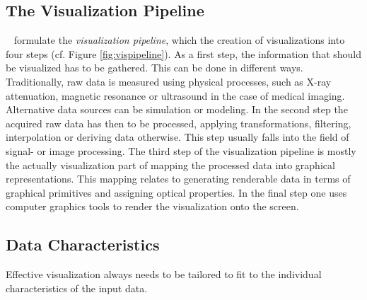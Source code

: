 \subsection{The Visualization Pipeline}
\label{sec:background:vis:vispipeline}

\CN~ formulate the \emph{visualization pipeline}, which  the creation of visualizations into four steps (cf. Figure \ref{fig:vispipeline}).
As a first step, the information that should be visualized has to be gathered.
This can be done in different ways. 
Traditionally, raw data is measured using physical processes, such as X-ray attenuation, magnetic resonance or ultrasound in the case of medical imaging.
Alternative data sources can be simulation or modeling.
In the second step the acquired raw data has then to be processed,  applying transformations, filtering, interpolation or deriving data otherwise.
This step usually falls into the field of signal- or image processing.
The third step of the visualization pipeline is mostly the actually visualization part of mapping the processed data into graphical representations.
This mapping relates to generating renderable data in terms of graphical primitives and assigning optical properties.
In the final step one uses computer graphics tools to render the visualization onto the screen.



\subsection{Data Characteristics}
\label{sec:Background:DataCharacteristics}
Effective visualization always needs to be tailored to fit to the individual characteristics of the input data.

